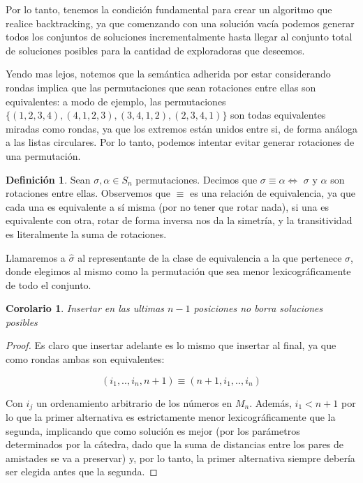 \documentclass{article}
\newtheorem{corollary}{Corolario}[theorem]
\theoremstyle{definition}
\newtheorem{definition}{Definición}[section]
\theoremstyle{remark}
\begin{document}
Por lo tanto, tenemos la condición fundamental para crear un algoritmo que realice backtracking, ya que comenzando con una solución vacía podemos generar todos los conjuntos de soluciones incrementalmente hasta llegar al conjunto total de soluciones posibles para la cantidad de exploradoras que deseemos.

Yendo mas lejos, notemos que la semántica adherida por estar considerando rondas implica que las permutaciones que sean rotaciones entre ellas son equivalentes: a modo de ejemplo, las permutaciones $\{(1, 2, 3, 4), (4, 1, 2, 3), (3, 4, 1, 2), (2, 3, 4, 1)\}$ son todas equivalentes miradas como rondas, ya que los extremos están unidos entre si, de forma análoga a las listas circulares. Por lo tanto, podemos intentar evitar generar rotaciones de una permutación.

\begin{definition}
Sean $\sigma, \alpha \in S_n$ permutaciones. Decimos que $\sigma \equiv \alpha \iff$ $\sigma$ y $\alpha$ son rotaciones entre ellas. Observemos que $\equiv$ es una relación de equivalencia, ya que cada una es equivalente a sí misma (por no tener que rotar nada), si una es equivalente con otra, rotar de forma inversa nos da la simetría, y la transitividad es literalmente la suma de rotaciones.

Llamaremos a $\hat{\sigma}$ al representante de la clase de equivalencia a la que pertenece $\sigma$, donde elegimos al mismo como la permutación que sea menor lexicográficamente de todo el conjunto.
\end{definition}

\begin{corollary}
Insertar en las ultimas $n-1$ posiciones no borra soluciones posibles
\end{corollary}

\begin{proof}
Es claro que insertar adelante es lo mismo que insertar al final, ya que como rondas ambas son equivalentes:

$$(i_1, .., i_n, n+1) \equiv (n+1, i_1, .., i_n)$$

Con $i_j$ un ordenamiento arbitrario de los números en $M_n$. Además, $i_1 < n+1$ por lo que la primer alternativa es estrictamente menor lexicográficamente que la segunda, implicando que como solución es mejor (por los parámetros determinados por la cátedra, dado que la suma de distancias entre los pares de amistades se va a preservar) y, por lo tanto, la primer alternativa siempre debería ser elegida antes que la segunda.
\end{proof}
\end{document}
